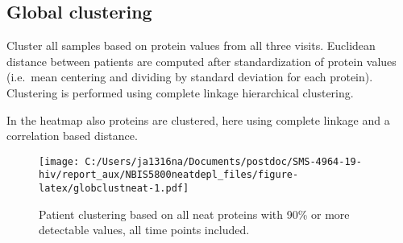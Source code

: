 \documentclass[
]{article}
\begin{document}
\FloatBarrier

\hypertarget{global-clustering}{%
\subsection{Global clustering}\label{global-clustering}}

Cluster all samples based on protein values from all three visits. Euclidean distance between patients are computed after standardization of protein values (i.e.~mean centering and dividing by standard deviation for each protein). Clustering is performed using complete linkage hierarchical clustering.

In the heatmap also proteins are clustered, here using complete linkage and a correlation based distance.

\begin{figure}
\centering
\texttt{[image: C:/Users/ja1316na/Documents/postdoc/SMS-4964-19-hiv/report\_aux/NBIS5800neatdepl\_files/figure-latex/globclustneat-1.pdf]}
\caption{\label{fig:globclustneat}Patient clustering based on all neat proteins with 90\% or more detectable values, all time points included.}
\end{figure}
\end{document}

